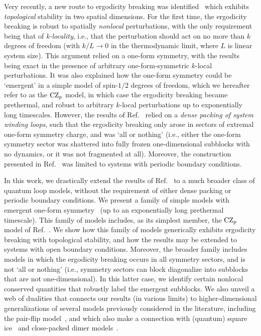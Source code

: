 Very recently, a new route to ergodicity breaking was identified~\cite{Stephen2022Robust} which exhibits {\it topological} stability in two spatial dimensions. For the first time, the ergodicity breaking is robust to spatially {\it nonlocal} perturbations, with the only requirement being that of {\it k-locality}, i.e., that the perturbation should act on no more than $k$ degrees of freedom (with $k/L \rightarrow 0$ in the thermodynamic limit, where $L$ is linear system size). This argument relied on a one-form symmetry, with the results being exact in the presence of arbitrary one-form-symmetric $k$-local perturbations. It was also explained how the one-form symmetry could be `emergent' in a simple model of spin-$1/2$ degrees of freedom, which we hereafter refer to as the $\text{CZ}_p$ model, in which case the ergodicity breaking became prethermal, and robust to arbitrary $k$-local perturbations up to exponentially long timescales.  However, the results of Ref.~\cite{Stephen2022Robust} relied on a {\it dense packing of system winding loops}, such that the ergodicity breaking only arose in sectors of extremal one-form symmetry charge, and was `all or nothing' (i.e., either the one-form symmetry sector was shattered into fully frozen one-dimensional subblocks with no dynamics, or it was not fragmented at all). Moreover, the construction presented in Ref.~\cite{Stephen2022Robust} was limited to systems with periodic boundary conditions. 

In this work, we drastically extend the results of Ref.~\cite{Stephen2022Robust} to a much broader class of quantum loop models, without the requirement of either dense packing or periodic boundary conditions. We present a family of simple models with emergent one-form symmetry~\cite{Nussinov2009Symmetry, Gaiotto2015Generalized, Lake2018Higher, McGreevy2022Generalized, Cordova2022Generalized} (up to an exponentially long prethermal timescale). This family of models includes, as its simplest member, the $\text{CZ}_p$ model of Ref.~\cite{Stephen2022Robust}. We show how this family of models generically exhibits ergodicity breaking with topological stability, and how the results may be extended to systems with open boundary conditions. Moreover, the broader family includes models in which the ergodicity breaking occurs in all symmetry sectors, and is not `all or nothing' (i.e., symmetry sectors can block diagonalize into subblocks that are not one-dimensional). In this latter case, we identify certain nonlocal conserved quantities that robustly label the emergent subblocks. We also unveil a web of dualities that connects our results (in various limits) to higher-dimensional generalizations of several models previously considered in the literature, including the pair-flip model~\cite{Caha2018PairFlip, Moudgalya2022Commutant}, and which also make a connection with (quantum) square ice~\cite{Lieb1967Ice, Moessner2004Planar, Shannon2004SquareIce} and close-packed dimer models~\cite{Kasteleyn1961StatisticsI, Temperley1961Dimer, Kasteleyn1963Dimer, Fisher1963Statistical, Rokhsar1988Superconductivity, Henley1997Relaxation, Henley2004Classical, Moessner2010Quantum}. 

